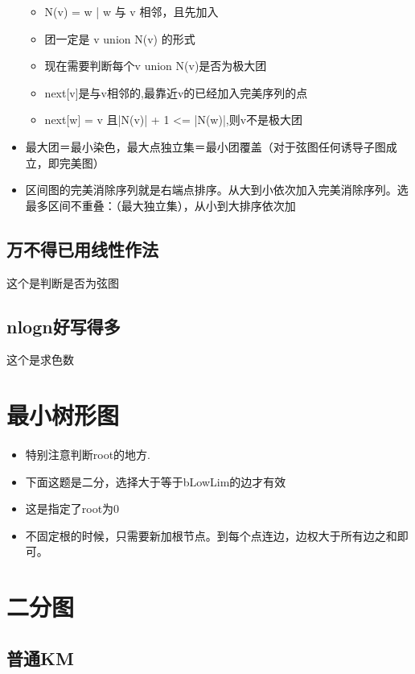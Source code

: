 \documentclass[landscape]{report}
\newcommand{\includecode}[2][c]{}
\begin{document}
\begin{flushleft}
\begin{multicols}{2}
\begin{itemize}
\begin{itemize}
    	\item N(v) = {w | w 与 v 相邻，且先加入}
       \item 团一定是 v union N(v) 的形式
      \item 现在需要判断每个v union N(v)是否为极大团
     \item next[v]是与v相邻的,最靠近v的已经加入完美序列的点
     \item next[w] = v 且|N(v)| + 1 <= |N(w)|,则v不是极大团
    
  		\end{itemize}
  \item  最大团＝最小染色，最大点独立集＝最小团覆盖（对于弦图任何诱导子图成立，即完美图）
  \item 区间图的完美消除序列就是右端点排序。从大到小依次加入完美消除序列。选最多区间不重叠：（最大独立集），从小到大排序依次加
\end{itemize}

\subsection{ 万不得已用线性作法}
这个是判断是否为弦图
\includecode[c++]{zoj1015.cpp}
\subsection{ nlogn好写得多}
这个是求色数
\includecode[c++]{hnoi2008.cpp}

\section{最小树形图}
\paragraph{ }
\begin{itemize}
\item  特别注意判断root的地方.
\item 下面这题是二分，选择大于等于bLowLim的边才有效
\item 这是指定了root为0
\item 不固定根的时候，只需要新加根节点。到每个点连边，边权大于所有边之和即可。
\end{itemize}
\includecode[c++]{uva11865.cpp}
\section{二分图}
\subsection{ 普通KM}
\includecode[c++]{uva11383.cpp}

\end{multicols}
\end{flushleft}
\end{document}
